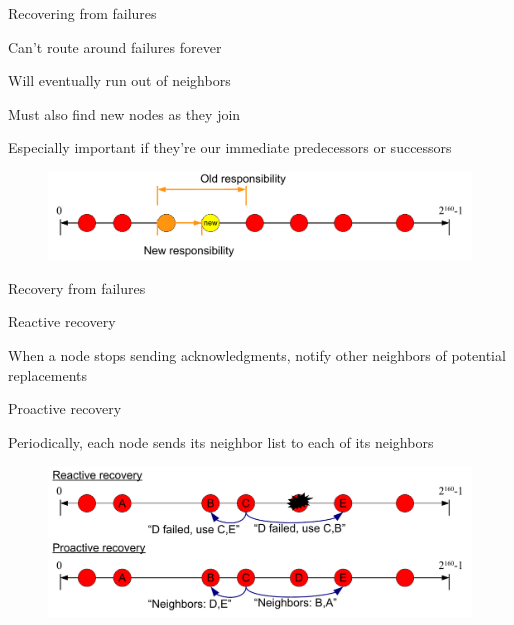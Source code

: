 \begin{frame}{Recovering from failures}

\BIL
\item Can't route around failures forever 
	\BI
	\item Will eventually run out of neighbors
	\EI
\item Must also find new nodes as they join
	\BI
	\item Especially important if they're our immediate predecessors or successors
	\EI
\EIL

\begin{figure}
	\includegraphics[width=\textwidth]{dht-recovery}
\end{figure}

\end{frame}

\begin{frame}{Recovery from failures}

\BIL
\item \alert{Reactive recovery}
\BI
\item When a node stops sending acknowledgments, notify other neighbors of potential replacements
\EI
\item \alert{Proactive recovery}
\BI
\item Periodically, each node sends its neighbor list to each of its neighbors
\EI
\EIL

\begin{figure}
	\includegraphics[width=\textwidth]{dht-repair}
\end{figure}

\end{frame}

